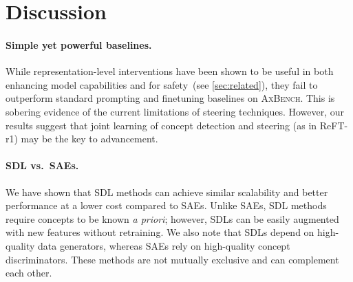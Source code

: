 \documentclass{article}
\theoremstyle{plain}
\theoremstyle{definition}
\theoremstyle{remark}
\newcommand{\shortbenchmark}{\textsc{AxBench}}
\newcommand{\methodtag}[2]{%
  \tikz[baseline=(char.base)]{%
    \node[
      fill=#1,
      rounded corners=2pt,
      text=white,
      font=\bfseries,
      minimum width=1em,
      minimum height=1em,
      align=center,
      inner sep=0pt
    ](char){#2};%
  }%
}
\newcommand{\steeringtag}{\protect\methodtag{steeringcolor}{S}}
\begin{document}

\section{Discussion}


\paragraph{Simple yet powerful baselines.} While representation-level interventions have been shown to be useful in both enhancing model capabilities and for safety~(see \cref{sec:related}), they fail to outperform standard prompting and finetuning baselines on \shortbenchmark{}. This is sobering evidence of the current limitations of steering techniques. However, our results suggest that joint learning of concept detection and steering (as in ReFT-r1) may be the key to advancement.

\paragraph{SDL vs.~SAEs.} We have shown that SDL methods can achieve similar scalability and better performance at a lower cost compared to SAEs. Unlike SAEs, SDL methods require concepts to be known \emph{a priori}; however, SDLs can be easily augmented with new features without retraining. We also note that SDLs depend on high-quality data generators, whereas SAEs rely on high-quality concept discriminators. These methods are not mutually exclusive and can complement each other. 

\end{document}
